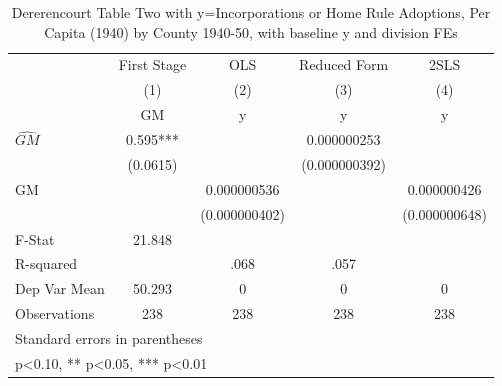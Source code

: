 \begin{table}[htbp]\centering
\def\sym#1{\ifmmode^{#1}\else\(^{#1}\)\fi}
\caption{Dererencourt Table Two with y=Incorporations or Home Rule Adoptions, Per Capita (1940) by County 1940-50, with baseline y and division FEs}
\begin{tabular}{l*{4}{c}}
\toprule
                    & First Stage   &         OLS   &Reduced Form   &        2SLS   \\
                    &\multicolumn{1}{c}{(1)}&\multicolumn{1}{c}{(2)}&\multicolumn{1}{c}{(3)}&\multicolumn{1}{c}{(4)}\\
                    &\multicolumn{1}{c}{GM}&\multicolumn{1}{c}{y}&\multicolumn{1}{c}{y}&\multicolumn{1}{c}{y}\\
\midrule
$\hat{GM}$          &       0.595***&               & 0.000000253   &               \\
                    &    (0.0615)   &               &(0.000000392)   &               \\
\addlinespace
GM                  &               & 0.000000536   &               & 0.000000426   \\
                    &               &(0.000000402)   &               &(0.000000648)   \\
\midrule
F-Stat              &      21.848   &               &               &               \\
R-squared           &               &        .068   &        .057   &               \\
Dep Var Mean        &      50.293   &           0   &           0   &           0   \\
Observations        &         238   &         238   &         238   &         238   \\
\bottomrule
\multicolumn{5}{l}{\footnotesize Standard errors in parentheses}\\
\multicolumn{5}{l}{\footnotesize * p<0.10, ** p<0.05, *** p<0.01}\\
\end{tabular}
\end{table}
